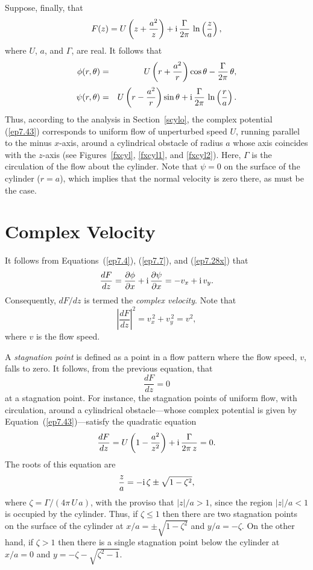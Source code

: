 Suppose, finally, that
\begin{equation}\label{ep7.43}
F(z)= U\left(z+\frac{a^2}{z}\right) + {\rm i}\,\frac{\Gamma}{2\pi}\,\ln\left(\frac{z}{a}\right),
\end{equation}
where $U$, $a$, and $\Gamma$, are real. It follows that
\begin{eqnarray}
\phi(r,\theta)&=&U\left(r+\frac{a^2}{r}\right)\cos\theta-\frac{\Gamma}{2\pi}\,\theta,\\[0.5ex]
\psi(r,\theta)&=&U\left(r-\frac{a^2}{r}\right)\sin\theta + {\rm i}\,\frac{\Gamma}{2\pi}\,\ln\left(\frac{r}{a}\right).
\end{eqnarray}
Thus, according to the analysis in Section~\ref{scylo}, the complex potential (\ref{ep7.43}) corresponds to uniform
flow of unperturbed speed $U$, running parallel to the minus $x$-axis, around a cylindrical obstacle of radius $a$ whose
axis coincides with the $z$-axis (see Figures~\ref{fxcyl}, \ref{fxcyl1}, and \ref{fxcyl2}). Here, $\Gamma$ is the circulation of the flow about the cylinder. Note that $\psi=0$
on the  surface of the cylinder ($r=a$), which implies that the normal velocity is zero there, as must be the case.

\section{Complex Velocity}
It follows from Equations~(\ref{ep7.4}), (\ref{ep7.7}), and (\ref{ep7.28x}) that
\begin{equation}
\frac{dF}{dz} = \frac{\partial\phi}{\partial x} + {\rm i}\,\frac{\partial\psi}{\partial x} = -v_x+{\rm i}\,v_y.
\end{equation}
Consequently, $dF/dz$ is termed the {\em complex velocity}. Note that
\begin{equation}
\left|\frac{dF}{dz}\right|^2 = v_x^{\,2} + v_y^{\,2} =v^2,
\end{equation}
where $v$ is the flow speed. 

A {\em stagnation point}\/  is defined as a point in a flow pattern where the flow speed, $v$, falls to zero. 
It follows, from the previous equation, that
\begin{equation}
\frac{dF}{dz} = 0
\end{equation}
at a stagnation point. For instance, the stagnation points of uniform flow, with circulation, around a
cylindrical obstacle---whose complex potential is given
by Equation~(\ref{ep7.43})---satisfy the quadratic equation
\begin{equation}
\frac{dF}{dz}= U\left(1-\frac{a^2}{z^2}\right) + {\rm i}\,\frac{\Gamma}{2\pi\,z} = 0.
\end{equation}
The roots of this equation are
\begin{equation}
\frac{z}{a} = -{\rm i}\,\zeta \pm \sqrt{1-\zeta^2},
\end{equation}
where $\zeta=\Gamma/(4\pi\,U\,a)$, 
with the proviso that $|z|/a>1$, since the region $|z|/a<1$ is occupied by the cylinder. Thus, if
$\zeta \leq 1$ then there are two stagnation points on the surface of the cylinder at $x/a=\pm\sqrt{1-\zeta^2}$ and $y/a=-\zeta$. 
On the other hand, if $\zeta>1$ then there is a single stagnation point below the cylinder at $x/a=0$ and $y=-\zeta-\sqrt{\zeta^2-1}$.

